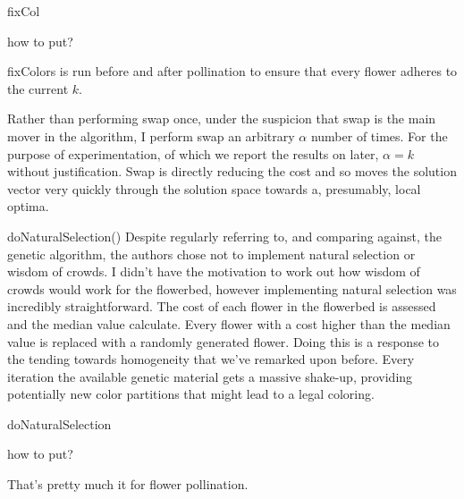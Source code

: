 \begin{algorithm}[H]
    \caption{fixCol}
    \label{FPA2.1}
    \begin{algorithmic}[1] %
			\State how to put?
		\EndProcedure
    \end{algorithmic}
\end{algorithm}

fixColors is run before and after pollination to ensure that every flower adheres to the current $k$.

Rather than performing swap once, under the suspicion that swap is the main mover in the algorithm, I perform swap an arbitrary $\alpha$ number of times. For the purpose of experimentation, of which we report the results on later,  $\alpha = k$ without justification. Swap is directly reducing the cost and so moves the solution vector very quickly through the solution space towards a, presumably, local optima.

doNaturalSelection()
Despite regularly referring to, and comparing against, the genetic algorithm, the authors chose not to implement natural selection or wisdom of crowds. I didn't have the motivation to work out how wisdom of crowds would work for the flowerbed, however implementing natural selection was incredibly straightforward.
The cost of each flower in the flowerbed is assessed and the median value calculate. Every flower with a cost higher than the median value is replaced with a randomly generated flower.
Doing this is a response to the tending towards homogeneity that we've remarked upon before. Every iteration the available genetic material gets a massive shake-up, providing potentially new color partitions that might lead to a legal coloring.

\begin{algorithm}[H]
    \caption{doNaturalSelection}
    \label{FPA2.2}
    \begin{algorithmic}[1] %
			\State how to put?
		\EndProcedure
    \end{algorithmic}
\end{algorithm}


That's pretty much it for flower pollination.









